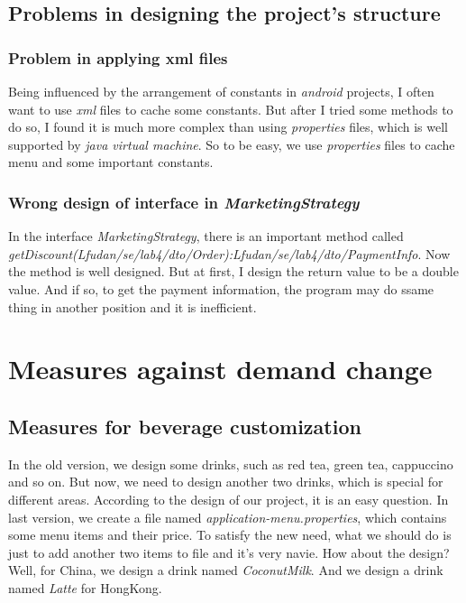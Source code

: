 \documentclass[a4paper]{report}
\begin{document}
\section{Problems in designing the project's structure}
\subsection{Problem in applying xml files}
\par Being influenced by the arrangement of constants in \emph{android} projects, I often want to use \emph{xml} files to cache some constants. But after I tried some methods to do so, I found it is much more complex than using \emph{properties} files, which is well supported by \emph{java virtual machine}. So to be easy, we use \emph{properties} files to cache menu and some important constants.
\subsection{Wrong design of interface in \emph{MarketingStrategy}}
\par In the interface \emph{MarketingStrategy}, there is an important method called \emph{getDiscount(Lfudan/se/lab4/dto/Order):Lfudan/se/lab4/dto/PaymentInfo}. Now the method is well designed. But at first, I design the return value to be a double value. And if so, to get the payment information, the program may do ssame thing in another position and it is inefficient.
\chapter{Measures against demand change}
\section{Measures for beverage customization}
\par In the old version, we design some drinks, such as red tea, green tea, cappuccino and so on. But now, we need to design another two drinks, which is special for different areas. According to the design of our project, it is an easy question. In last version, we create a file named \emph{application-menu.properties}, which contains some menu items and their price. To satisfy the new need, what we should do is just to add another two items to file and it's very navie. How about the design? Well, for China, we design a drink named \emph{CoconutMilk}. And we design a drink named \emph{Latte} for HongKong.
\end{document}
